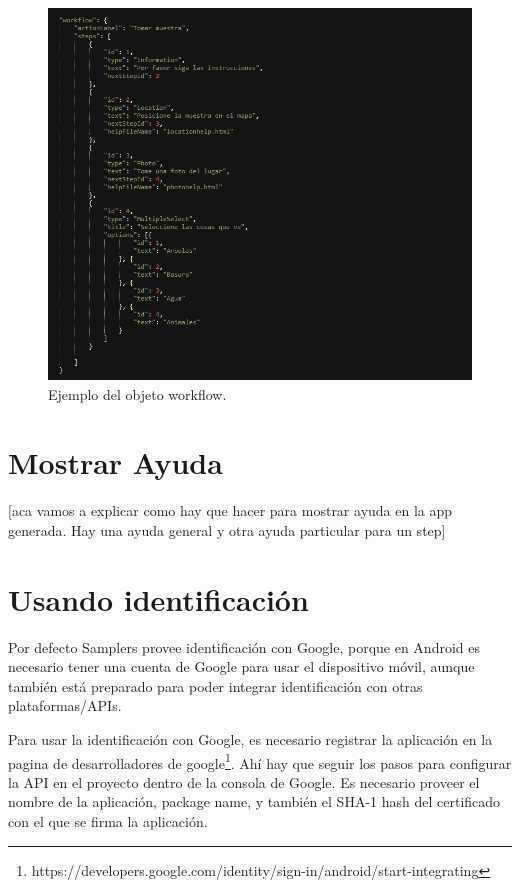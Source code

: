 	
\begin{figure}[H]
  \centering
    \includegraphics[scale=0.6]{50-anexos/B-uso/json_workflow.png} 
    \caption{Ejemplo del objeto workflow.}
\end{figure}	
		



\section{Mostrar Ayuda} \label{sec:mostrar_ayuda}
[aca vamos a explicar como hay que hacer para mostrar ayuda en la app generada. Hay una ayuda general y otra ayuda particular para un step]

\section{Usando identificación} \label{sec:usando_autenticacion}
Por defecto Samplers provee identificación con Google, porque en Android es necesario tener una cuenta de Google para usar el dispositivo móvil, aunque también está preparado para poder integrar identificación con otras plataformas/APIs.

Para usar la identificación con Google, es necesario registrar la aplicación en la pagina de desarrolladores de google\footnote{https://developers.google.com/identity/sign-in/android/start-integrating}. Ahí hay que seguir los pasos para configurar la API en el proyecto dentro de la consola de Google. Es necesario proveer el nombre de la aplicación, package name, y también el SHA-1 hash del certificado con el que se firma la aplicación.

